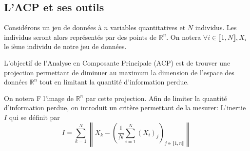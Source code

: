 \subsection{L'ACP et ses outils}
Considérons un jeu de données à $n$ variables quantitatives et $N$ individus.
Les individus seront alors représentés par des points de $\mathbb{R}^n$.
On notera $\forall i\in\llbracket1,N\rrbracket, X_i$ le ième individu de
notre jeu de données.

L'objectif de l'Analyse en Composante Principale (ACP) est de trouver une
projection permettant de diminuer au maximum la dimension de l'espace des
données $\mathbb{R}^n$ tout en limitant la quantité d'information perdue.

On notera F l'image de $\mathbb{R}^n$ par cette projection.
Afin de limiter la quantité d'information perdue, on introduit un critère
permettant de la mesurer: L'inertie $I$ qui se définit par
$$ I =
\sum_{k=1}^{N}
\left\|
X_k -
\left(
\frac1N\sum_{i=1}^N
\left(X_i\right)_j
\right)_{j\in\llbracket1,n\rrbracket}
\right\|$$

